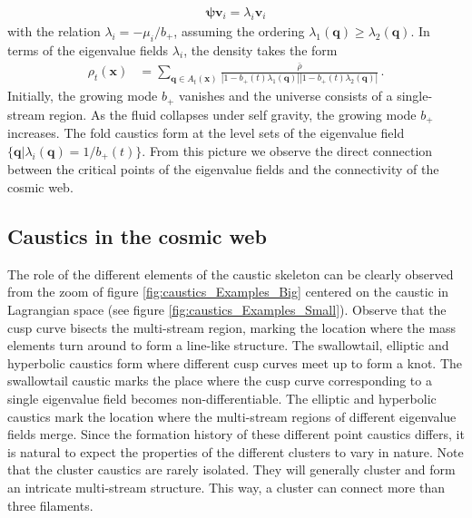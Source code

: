 \documentclass[a4paper, 11pt]{article}
\begin{document}
\begin{align}
\bm{\psi}\bm{v}_i = \lambda_i \bm{v}_i
\end{align}
with the relation $\lambda_i =-\mu_i/b_+$, assuming the ordering $\lambda_1(\bm{q}) \geq \lambda_2(\bm{q})$. In terms of the eigenvalue fields $\lambda_i$, the density takes the form 
\begin{align}
\rho_t(\bm{x})
&= \sum_{\bm{q} \in A_t(\bm{x})} \frac{\bar{\rho}}{|1-b_+(t) \lambda_1(\bm{q})||1-b_+(t) \lambda_2(\bm{q})|}\,.
\end{align}
Initially, the growing mode $b_+$ vanishes and the universe consists of a single-stream region. As the fluid collapses under self gravity, the growing mode $b_+$ increases. The fold caustics form at the level sets of the eigenvalue field $\{\bm{q}|\lambda_i(\bm{q})=1/b_+(t)\}$. From this picture we observe the direct connection between the critical points of the eigenvalue fields and the connectivity of the cosmic web.


\subsection{Caustics in the cosmic web}
The role of the different elements of the caustic skeleton can be clearly observed from the zoom of figure \ref{fig:caustics_Examples_Big} centered on the caustic in Lagrangian space (see figure \ref{fig:caustics_Examples_Small}). Observe that the cusp curve bisects the multi-stream region, marking the location where the mass elements turn around to form a line-like structure. The swallowtail, elliptic and hyperbolic caustics form where different cusp curves meet up to form a knot. The swallowtail caustic marks the place where the cusp curve corresponding to a single eigenvalue field becomes non-differentiable. The elliptic and hyperbolic caustics mark the location where the multi-stream regions of different eigenvalue fields merge. Since the formation history of these different point caustics differs, it is natural to expect the properties of the different clusters to vary in nature. Note that the cluster caustics are rarely isolated. They will generally cluster and form an intricate multi-stream structure. This way, a cluster can connect more than three filaments.
\end{document}
